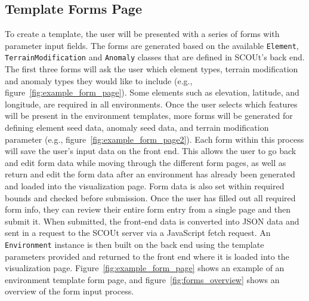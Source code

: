 \subsection{Template Forms Page} \label{subsec:template_forms_page}
To create a template, the user will be presented with a series of forms with parameter input fields.
The forms are generated based on the available \texttt{Element}, \texttt{TerrainModification} and \texttt{Anomaly} classes that are defined in SCOUt's back end.
The first three forms will ask the user which element types, terrain modification and anomaly types they would like to include (e.g., figure~\ref{fig:example_form_page}).
Some elements such as elevation, latitude, and longitude, are required in all environments.
Once the user selects which features will be present in the environment templates, more forms will be generated for defining element seed data, anomaly seed data, and terrain modification parameter (e.g., figure~\ref{fig:example_form_page2}).
Each form within this process will save the user’s input data on the front end.
This allows the user to go back and edit form data while moving through the different form pages, as well as return and edit the form data after an environment has already been generated and loaded into the visualization page.
Form data is also set within required bounds and checked before submission.
Once the user has filled out all required form info, they can review their entire form entry from a single page and then submit it.
When submitted, the front-end data is converted into JSON data and sent in a request to the SCOUt server via a JavaScript fetch request.
An \texttt{Environment} instance is then built on the back end using the template parameters provided and returned to the front end where it is loaded into the visualization page.
Figure~\ref{fig:example_form_page} shows an example of an environment template form page, and figure~\ref{fig:forms_overview} shows an overview of the form input process.

